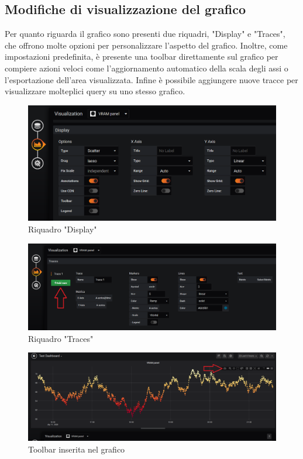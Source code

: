     \subsection{Modifiche di visualizzazione del grafico}
        Per quanto riguarda il grafico sono presenti due riquadri, "Display" e "Traces", che offrono molte opzioni per personalizzare l'aspetto del grafico. Inoltre, come impostazioni predefinita, è presente una toolbar direttamente sul grafico per compiere azioni veloci come l'aggiornamento automatico della scala degli assi o l'esportazione dell'area visualizzata. Infine è possibile aggiungere nuove tracce per visualizzare molteplici query su uno stesso grafico.
        \begin{figure}[H]
            \includegraphics[width=\textwidth,height=\textheight,keepaspectratio]{img/display.png}
            \caption{Riquadro "Display"}
        \end{figure}
        \begin{figure}[H]
            \includegraphics[width=\textwidth,height=\textheight,keepaspectratio]{img/traces.png}
            \caption{Riquadro "Traces"}
        \end{figure}
        \begin{figure}[H]
            \includegraphics[width=\textwidth,height=\textheight,keepaspectratio]{img/toolbar.png}
            \caption{Toolbar inserita nel grafico}
        \end{figure}
